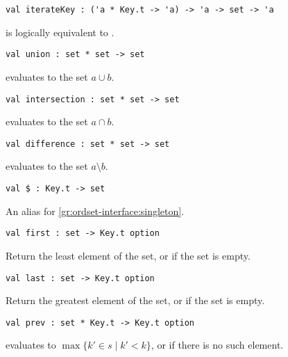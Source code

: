 \begin{gram}[iterateKey]
\begin{verbatim}
val iterateKey : ('a * Key.t -> 'a) -> 'a -> set -> 'a
\end{verbatim}
 is logically equivalent to .
\end{gram}

\begin{gram}[union]
\begin{verbatim}
val union : set * set -> set
\end{verbatim}
 evaluates to the set $a \cup b$.
\end{gram}

\begin{gram}[intersection]
\begin{verbatim}
val intersection : set * set -> set
\end{verbatim}
 evaluates to the set $a \cap b$.
\end{gram}

\begin{gram}[difference]
\begin{verbatim}
val difference : set * set -> set
\end{verbatim}
 evaluates to the set $a \setminus b$.
\end{gram}

\begin{gram}[\$]
\begin{verbatim}
val $ : Key.t -> set
\end{verbatim}
An alias for \ref{gr:ordset-interface:singleton}.
\end{gram}

\begin{gram}[first]
\begin{verbatim}
val first : set -> Key.t option
\end{verbatim}
Return the least element of the set, or  if the set is empty.
\end{gram}

\begin{gram}[last]
\begin{verbatim}
val last : set -> Key.t option
\end{verbatim}
Return the greatest element of the set, or  if the set is empty.
\end{gram}

\begin{gram}[prev]
\begin{verbatim}
val prev : set * Key.t -> Key.t option
\end{verbatim}
 evaluates to $\max \{ k' \in s \mathbin| k' < k \}$, or
 if there is no such element.
\end{gram}

